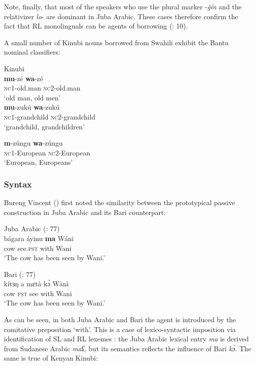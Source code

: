 \documentclass[output=paper]{langsci/langscibook}
\begin{document}
Note, finally, that most of the speakers who use the plural marker -\textit{ǧín} and the relativizer \textit{lo}{}- are dominant in Juba Arabic. These cases therefore confirm the fact that RL monolinguals can be agents of borrowing (\citealt{VanCoetsem1988}: 10).

A small number of Kinubi nouns borrowed from Swahili exhibit the Bantu nominal classifiers:

\ea

{Kinubi \citep[57]{Wellens2003}}\\
 
\ea\textbf{mu}-zé               \textbf{wa}-zé\\
 
{\textsc{nc}1-old.man   \textsc{nc2}-old.man}\\
 {`old man, old men'}\\
 
\ex
\gll  \textbf{mu}-zukú \textbf{wa}-zukú\\
          \textsc{nc}1-grandchild   \textsc{nc}2-grandchild\\
\glt       `grandchild, grandchildren'

\ex
\gll \textbf{m}-zúngu \textbf{wa}-zúngu\\
         \textsc{nc}1-European   \textsc{nc}2-European\\
\glt       `European, Europeans'
\z
\z

 \subsubsection{Syntax}

Bureng Vincent (\citeyear[77]{BurengVincent1986}) first noted the similarity between the prototypical passive construction in Juba Arabic and its Bari counterpart:


\ea
{Juba Arabic (\citealt{BurengVincent1986}: 77)}\\
\ea\gll  bágara áyinu \textbf{ma} Wáni\\
        cow see.\textsc{pst} with Wani\\
\glt      `The cow has been seen by Wani.'

\ex
{Bari (\citealt{BurengVincent1986}: 77)}\\
\gll             kítɜŋ a mɛtà kɔ̀ Wànì\\
                 cow \textsc{pst} see with Wani\\
\glt     `The cow has been seen by Wani.'
\z
\z

As can be seen, in both Juba Arabic and Bari the agent is introduced by the comitative preposition ‘with’. This is a case of lexico-syntactic imposition via identification of SL and RL lexemes \citep[415]{Manfredi2018}: the Juba Arabic lexical entry \textit{ma} is derived from Sudanese Arabic \textit{maʕ}, but its semantics reflects the influence of Bari \textit{kɔ̀}. The same is true of Kenyan Kinubi:
\end{document}
